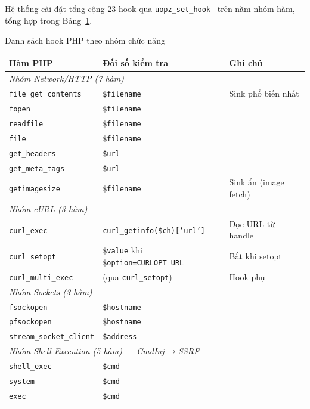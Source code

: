 Hệ thống cài đặt tổng cộng 23 hook qua
\texttt{uopz\_set\_hook}~\cite{phpgroup2023uopz} trên năm nhóm hàm,
tổng hợp trong Bảng~\ref{tab:php-hooks}.

\begin{table}[h]{Danh sách hook PHP theo nhóm chức năng}
\label{tab:php-hooks}
\centering
\small
\begin{tabular}{|l|l|p{4.2cm}|}
\hline
\textbf{Hàm PHP} & \textbf{Đối số kiểm tra} & \textbf{Ghi chú} \\
\hline
\multicolumn{3}{|l|}{\textit{Nhóm Network/HTTP (7 hàm)}} \\
\hline
\texttt{file\_get\_contents}  & \texttt{\$filename}  & Sink phổ biến nhất \\
\texttt{fopen}                & \texttt{\$filename}  & \\
\texttt{readfile}             & \texttt{\$filename}  & \\
\texttt{file}                 & \texttt{\$filename}  & \\
\texttt{get\_headers}         & \texttt{\$url}       & \\
\texttt{get\_meta\_tags}      & \texttt{\$url}       & \\
\texttt{getimagesize}         & \texttt{\$filename}  & Sink ẩn (image fetch) \\
\hline
\multicolumn{3}{|l|}{\textit{Nhóm cURL (3 hàm)}} \\
\hline
\texttt{curl\_exec}           & \texttt{curl\_getinfo(\$ch)['url']} & Đọc URL từ handle \\
\texttt{curl\_setopt}         & \texttt{\$value} khi \texttt{\$option=CURLOPT\_URL} & Bắt khi setopt \\
\texttt{curl\_multi\_exec}    & (qua \texttt{curl\_setopt})          & Hook phụ \\
\hline
\multicolumn{3}{|l|}{\textit{Nhóm Sockets (3 hàm)}} \\
\hline
\texttt{fsockopen}            & \texttt{\$hostname}  & \\
\texttt{pfsockopen}           & \texttt{\$hostname}  & \\
\texttt{stream\_socket\_client} & \texttt{\$address} & \\
\hline
\multicolumn{3}{|l|}{\textit{Nhóm Shell Execution (5 hàm) — CmdInj → SSRF}} \\
\hline
\texttt{shell\_exec}          & \texttt{\$cmd}       & \\
\texttt{system}               & \texttt{\$cmd}       & \\
\texttt{exec}                 & \texttt{\$cmd}       & \\

\end{tabular}
\end{table}

